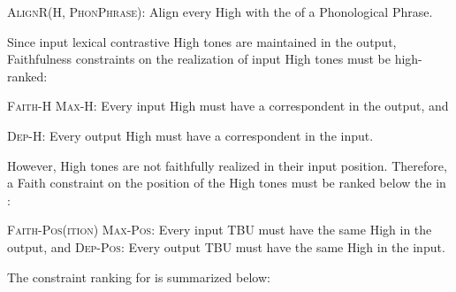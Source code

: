 \documentclass[output=paper
,newtxmath
,modfonts
,nonflat]{langsci/langscibook}
\begin{document}
\begin{comment}
\ea%
    \label{bkm:Ref336872994}
    \langinfo{lg}{fam}{src}\\
    \gll \\  
        \\
    \glt
    \z
\end{comment}

\ea\label{ex:downing:14}\textsc{AlignR(H, PhonPhrase}):
\sn
Align every High  with the  of a Phonological Phrase.
\z 

Since input lexical contrastive High tones are maintained in the output, Faithfulness constraints on the realization of input High tones must be high-ranked:
\begin{comment}
\ea%
    \label{bkm:Ref355202500}
    \langinfo{lg}{fam}{src}\\
    \gll \\  
        \\
    \glt
    \z
\end{comment}

\ea\label{ex:downing:15}\textsc{Faith-H}
\ea\label{ex:downing:15a} \textsc{Max-H}: Every input High  must have a correspondent in the output, and

\ex\label{ex:downing:15b}\textsc{Dep-H}: Every output High  must have a correspondent in the input.
\z
\z

However, High tones are not faithfully realized in their input position. Therefore, a Faith constraint on the position of the High tones must be ranked below the  in :
\begin{comment}
\ea 
 \gll \\
   \\
 \glt
\z
\end{comment}

\ea\label{ex:downing:16}  \textsc{Faith-Pos(ition)}
\sn
\ea\label{ex:downing:16a} \textsc{Max-Pos}: Every input TBU must have the same High  in the output, and
\ex\label{ex:downing:16a}\textsc{Dep-Pos}: Every output TBU must have the same High  in the input.
\z
\z

The constraint ranking for  is summarized below:

\begin{comment}
\ea 
 \gll \\
   \\
 \glt
\z
\end{comment}
\end{document}
